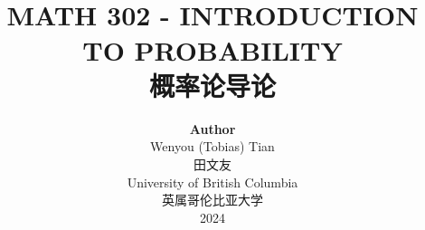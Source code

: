 \title{ \normalsize \textsc{}
		\\ [2.0cm]
		\HRule{1.5pt} \\
		\LARGE \textbf{\uppercase{MATH 302 - Introduction to Probability}
		\HRule{2.0pt} \\ [0.6cm] \LARGE{概率论导论} \vspace*{10\baselineskip}}
		}
\date{}
\author{\textbf{Author} \\ 
		Wenyou (Tobias) Tian \\
        田文友 \\
		University of British Columbia \\
        英属哥伦比亚大学 \\
		2024}

\maketitle
\newpage

\tableofcontents
\newpage